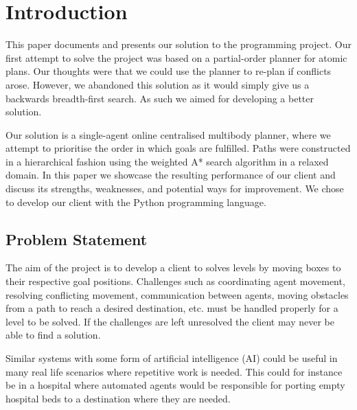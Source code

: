 \section{Introduction}
\label{sec:introduction}


This paper documents and presents our solution to the programming project.
Our first attempt to solve the project was based on a partial-order planner for atomic plans.
Our thoughts were that we could use the planner to re-plan if conflicts arose.
However, we abandoned this solution as it would simply give us a backwards breadth-first search.
As such we aimed for developing a better solution.

Our solution is a single-agent online centralised multibody planner, where we attempt to prioritise the order in which goals are fulfilled.
Paths were constructed in a hierarchical fashion using the weighted A* search algorithm in a relaxed domain.
In this paper we showcase the resulting performance of our client and discuss its strengths, weaknesses, and potential ways for improvement.
We chose to develop our client with the Python programming language.

\subsection{Problem Statement}

The aim of the project is to develop a client to solves levels by moving boxes to their respective goal positions.
Challenges such as coordinating agent movement, resolving conflicting movement, communication between agents, moving obstacles from a path to reach a desired destination, etc. must be handled properly for a level to be solved.
If the challenges are left unresolved the client may never be able to find a solution.

Similar systems with some form of artificial intelligence (AI) could be useful in many real life scenarios where repetitive work is needed.
This could for instance be in a hospital where automated agents would be responsible for porting empty hospital beds to a destination where they are needed.




